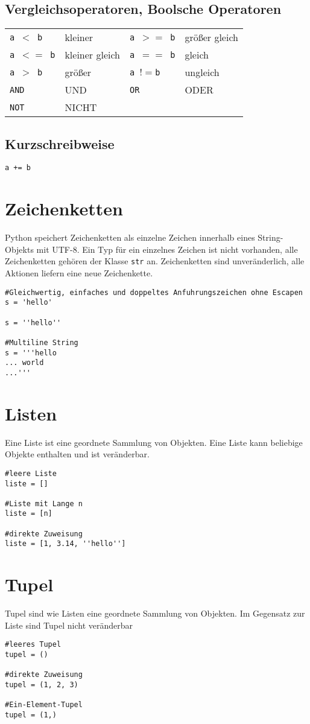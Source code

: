 \subsection{Vergleichsoperatoren, Boolsche Operatoren}
\begin{tabular}{lp{4cm}lp{6cm}}
\texttt{a $<$ b}	&kleiner	&\texttt{a $>=$ b}	&größer gleich\\
\texttt{a $<=$ b}	&kleiner gleich	&\texttt{a $==$ b}	&gleich\\
\texttt{a $>$ b}	&größer	&\texttt{a $!=$b}	&ungleich\\
\texttt{AND}	&UND	&\texttt{OR}	&ODER\\
\texttt{NOT}	&NICHT
\end{tabular}
\subsection{Kurzschreibweise}
\begin{lstlisting}
a += b
\end{lstlisting}
\section{Zeichenketten}
Python speichert Zeichenketten als einzelne Zeichen innerhalb eines String-Objekts mit UTF-8. Ein Typ für ein einzelnes Zeichen ist nicht vorhanden, alle Zeichenketten gehören der Klasse \texttt{str} an. Zeichenketten sind unveränderlich, alle Aktionen liefern eine neue Zeichenkette.
\begin{lstlisting}
#Gleichwertig, einfaches und doppeltes Anfuhrungszeichen ohne Escapen
s = 'hello'

s = ''hello''

#Multiline String
s = '''hello
... world
...'''
\end{lstlisting}
\section{Listen}
Eine Liste ist eine geordnete Sammlung von Objekten. Eine Liste kann beliebige Objekte enthalten und ist veränderbar.
\begin{lstlisting}
#leere Liste
liste = []

#Liste mit Lange n
liste = [n]

#direkte Zuweisung
liste = [1, 3.14, ''hello'']
\end{lstlisting}
\section{Tupel}
Tupel sind wie Listen eine geordnete Sammlung von Objekten. Im Gegensatz zur Liste sind Tupel nicht veränderbar
\begin{lstlisting}
#leeres Tupel
tupel = ()

#direkte Zuweisung
tupel = (1, 2, 3)

#Ein-Element-Tupel
tupel = (1,)
\end{lstlisting}
